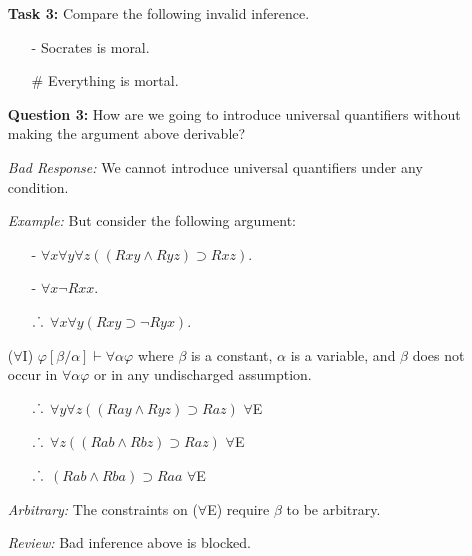 \documentclass[a4paper, 11pt]{article} %
\def\therefore{\ensuremath{\ldotp\dot\,\ldotp}}
\newcommand{\unisub}[2]{[#1/#2]}
\begin{document}
\begin{enumerate}
  \item[\bf Task 3:] Compare the following invalid inference.
    \begin{itemize}
      \item[-] Socrates is moral.
      \item[$\#$] Everything is mortal.
    \end{itemize}
  \item[\bf Question 3:] How are we going to introduce universal quantifiers without making the argument above derivable?
  \item[\it Bad Response:] We cannot introduce universal quantifiers under any condition.
  \item[\it Example:] But consider the following argument:
    \begin{itemize}
      \item[-] $\forall x\forall y\forall z((Rxy \wedge Ryz) \supset Rxz)$.
      \item[-] $\forall x\neg Rxx$.
      \item[$\therefore$] $\forall x\forall y(Rxy \supset \neg Ryx)$.
    \end{itemize}
  \item[($\forall$I)] $\varphi\unisub{\beta}{\alpha} \vdash \forall\alpha\varphi$ where $\beta$ is a constant, $\alpha$ is a variable, and $\beta$ does not occur in $\forall\alpha\varphi$ or in any undischarged assumption. 
    \begin{itemize}
      \item[$\therefore$] $\forall y\forall z((Ray \wedge Ryz) \supset Raz)$ \quad $\forall$E 
      \item[$\therefore$] $\forall z((Rab \wedge Rbz) \supset Raz)$ \quad $\forall$E
      \item[$\therefore$] $(Rab \wedge Rba) \supset Raa$ \quad $\forall$E
    \end{itemize}
  \item[\it Arbitrary:] The constraints on ($\forall$E) require $\beta$ to be arbitrary. 
  \item[\it Review:] Bad inference above is blocked.
\end{enumerate}
\end{document}
